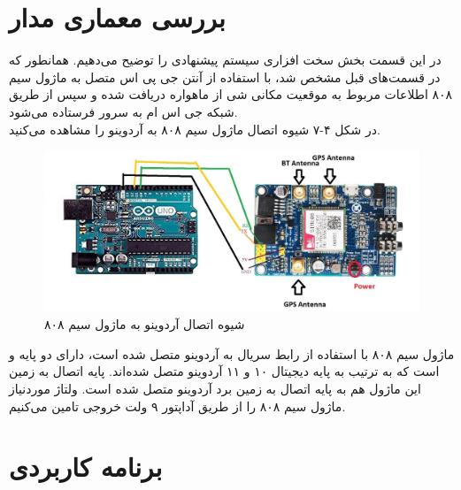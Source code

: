 \section{بررسی معماری مدار}
در این قسمت بخش سخت‌ افزاری سیستم پیشنهادی را توضیح می‌دهیم. همانطور که در قسمت‌های قبل مشخص شد، با استفاده از آنتن جی‌ پی اس متصل به ماژول سیم ۸۰۸ اطلاعات مربوط به موقعیت مکانی شی از ماهواره دریافت شده و سپس از طریق شبکه جی اس ام به سرور فرستاده می‌شود. \\
در شکل ۴-۷ شیوه اتصال ماژول سیم ۸۰۸ به آردوینو را مشاهده می‌کنید.
\\
\begin{figure}[!h]
	\centerline{\includegraphics[width=.6\textwidth]{sim808-arduino}}
	\caption{شیوه اتصال آردوینو به ماژول سیم ۸۰۸\cite{interface}}
\end{figure}


ماژول سیم ۸۰۸ با استفاده از رابط سریال به آردوینو متصل شده است، دارای دو پایه  و  است که به ترتیب به پایه دیجیتال ۱۰ و ۱۱ آردوینو متصل شده‌اند. پایه اتصال به زمین این ماژول هم به پایه اتصال به زمین برد آردوینو متصل شده است. ولتاژ موردنیاز ماژول سیم ۸۰۸ را از طریق آداپتور ۹ ولت خروجی تامین می‌کنیم. 
\section{برنامه کاربردی}